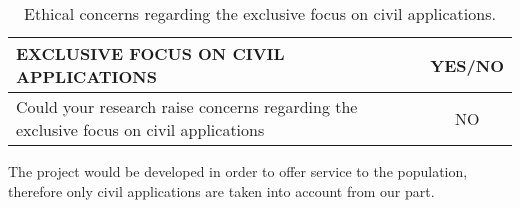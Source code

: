 \begin{table}[H]
	\centering
	\begin{tabular}[H]{ p{12.6cm} c }
		
		\toprule[2pt]
		
		\textbf{EXCLUSIVE FOCUS ON CIVIL APPLICATIONS} & \textbf{YES/NO} \\
		
		\midrule[1.5pt]
		
		Could your research raise concerns regarding the exclusive focus on civil applications\vspace{0.2cm} & NO\\
		
		\bottomrule[2pt]	
			
	\end{tabular}
	\caption[Ethics -Exclusive use on civil applications]{Ethical concerns regarding the exclusive focus on civil applications.}
	\label{Ethics_Civilfocus}
\end{table}

The project would be developed in order to offer service to the population, therefore only civil applications are taken into account from our part.